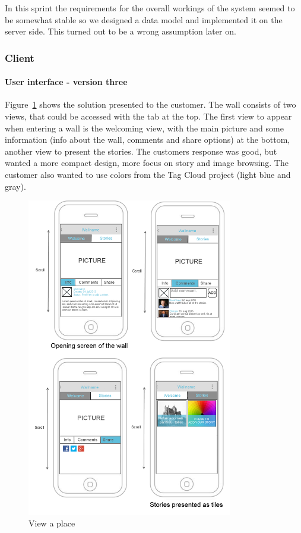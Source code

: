 \documentclass[11pt]{book}
\begin{document}
In this sprint the requirements for the overall workings of the system seemed to be somewhat stable so we designed a data model and implemented it on the server side. This turned out to be a wrong assumption later on.

\subsubsection{Client}
\paragraph{User interface - version three}
Figure~\ref{fig:phases_sprint2_uiVersionThreeViewWal} shows the solution presented to the customer. The wall consists of two views, that could be accessed with the tab at the top. The first view to appear when entering a wall is the welcoming view, with the main picture and some information (info about the wall, comments and share options) at the bottom, another view to present the stories. The customers response was good, but wanted a more compact design, more focus on story and image browsing. The customer also wanted to use colors from the Tag Cloud project (light blue and gray).

\begin{figure}[H]
    \centering
    \includegraphics[width=0.8\textwidth]{Figures/Phases/Sprint2/wallFunctionsCompact.png}
    \caption{View a place}
    \label{fig:phases_sprint2_uiVersionThreeViewWal}
\end{figure}
\end{document}
